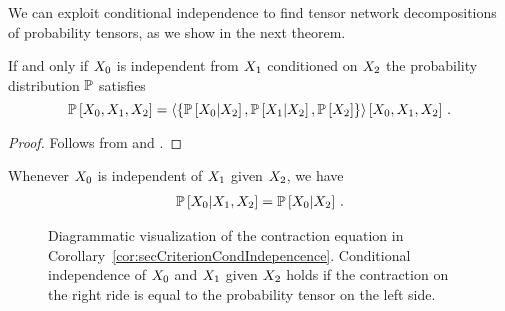 We can exploit conditional independence to find tensor network decompositions of probability tensors, as we show in the next theorem.

\begin{corollary}\label{cor:secCriterionCondIndepencence}
	If and only if $X_{0}$ is independent from $X_{1}$ conditioned on $X_{2}$ the probability distribution $\mathbb{P}$ satisfies
		\[ \mathbb{P}\left[X_{0}, X_{1}, X_{2}\right] 
		= \left\langle 
			\{ \mathbb{P}\left[X_{0}|X_{2}\right], \mathbb{P}\left[X_{1}|X_{2}\right], \mathbb{P}\left[X_{2}\right] \}
		\right\rangle \left[ 
			X_{0}, X_{1}, X_{2}
		 \right] \, .
		\]
\end{corollary}
\begin{proof}
	Follows from  and .
\end{proof}


\begin{corollary}\label{cor:conditionDropping}
	Whenever $X_{0}$ is independent of $X_{1}$ given $X_{2}$, we have
	\begin{align*}
		\mathbb{P}\left[X_{0}|X_{1},X_{2}\right] = \mathbb{P}\left[X_{0}|X_{2}\right] \, .
	\end{align*}
\end{corollary}


\begin{figure}[h]
\begin{center}
	
\end{center}
\caption{Diagrammatic visualization of the contraction equation in Corollary~\ref{cor:secCriterionCondIndepencence}. Conditional independence of $X_{0}$ and $X_{1}$ given $X_{2}$ holds if the contraction on the right ride is equal to the probability tensor on the left side.}
\end{figure}



